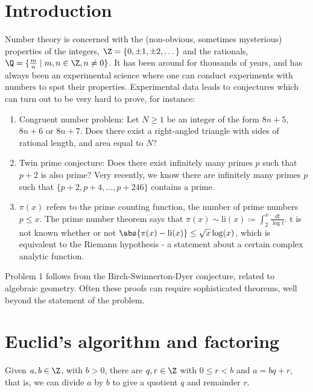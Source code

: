 \documentclass{article}
\begin{document}
\maketitle
\section{Introduction}
Number theory is concerned with the (non-obvious, sometimes mysterious) properties of the integers, $\Z = \{0, \pm 1, \pm 2, \dots\}$ and the rationals, $\Q = \{\frac{m}{n} \mid m, n \in \Z, n \ne 0\}$.
It has been around for thousands of years, and has always been an experimental science where one can conduct experiments with numbers to spot their properties. Experimental data leads to conjectures which can turn out to be very hard to prove, for instance:
\begin{enumerate}
    \item Congruent number problem: Let $N \geq 1$ be an integer of the form $8n + 5$, $8n+6$ or $8n + 7$.
        Does there exist a right-angled triangle with sides of rational length, and area equal to $N$?
    \item Twin prime conjecture: Does there exist infinitely many primes $p$ such that $p+2$ is also prime?
        Very recently, we know there are infinitely many primes $p$ such that $\{p+2, p+4, \dots, p+246\}$ contains a prime.
    \item $\pi(x)$ refers to the prime counting function, the number of prime numbers $p \leq x$.
        The prime number theorem says that $\pi(x) \sim \mathrm{li}(x) \coloneqq \int_2^x \frac{dt}{\log t}$.
        t is not known whether or not $\abs{\pi(x) - \mathrm{li}(x)} \leq \sqrt{x} \log(x)$, which is equivalent to the Riemann hypothesis - a statement about a certain complex analytic function.
\end{enumerate}
Problem 1 follows from the Birch-Swinnerton-Dyer conjecture, related to algebraic geometry.
Often these proofs can require sophisticated theorems, well beyond the statement of the problem.
\clearpage

\section{Euclid's algorithm and factoring}
\begin{defi}
    Given $a, b \in \Z$, with $b > 0$, there are $q, r \in \Z$ with $0 \leq r < b$ and $a = b q + r$, that is, we can divide $a$ by $b$ to give a quotient $q$ and remainder $r$.
\end{defi}
\end{document}
